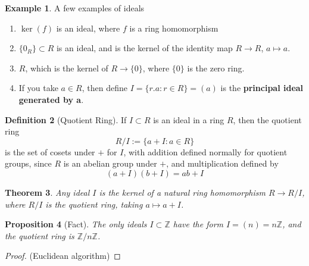 \documentclass[12pt]{article}
\newtheorem{thm}{Theorem}[section]
\newtheorem{prop}[thm]{Proposition}
\theoremstyle{definition}
\newtheorem{defn}[thm]{Definition}
\newtheorem{eg}[thm]{Example}
\theoremstyle{remark}
\numberwithin{equation}{section}
\newcommand\Z{\mathbb Z}    %
\newcommand\B[1]{\textbf{ #1}}
\begin{document}
\begin{eg}
        A few examples of ideals \begin{enumerate}
                \item $\ker(f)$ is an ideal, where $f$ is a ring homomorphism
                \item $\{0_R\} \subset R$ is an ideal, and is the kernel of the identity map $R\rightarrow R$, $a \mapsto a$.
                \item $R$, which is the kernel of $R \rightarrow \{0\}$, where $\{0\}$ is the zero ring.
                \item If you take $a \in R$, then define $I = \{r.a: r\in R\} = (a)$ is the \B{principal ideal generated by a}.
        \end{enumerate}
\end{eg}

\vspace{15pt}

\begin{defn}[Quotient Ring]
        If $I\subset R$ is an ideal in a ring $R$, then the quotient ring \begin{equation}
                R/I := \{a+I: a \in R\}
        \end{equation}
        is the set of cosets under $+$ for $I$, with addition defined normally for quotient groups, since $R$ is an abelian group under $+$, and multiplication defined by \begin{equation}
                (a+I)(b+I) = ab+I
        \end{equation}
\end{defn}


\vspace{15pt}


\begin{thm}
        Any ideal $I$ is the kernel of a natural ring homomorphism $R \rightarrow R/I$, where $R/I$ is the quotient ring, taking $a \mapsto a+I$. 
\end{thm}

\vspace{15pt}


\begin{prop}[Fact]
        The only ideals $I \subset \Z$ have the form $I = (n) = n\Z$, and the quotient ring is $\Z/n\Z$.
\end{prop}
\begin{proof}
        (Euclidean algorithm)
\end{proof}
\end{document}
